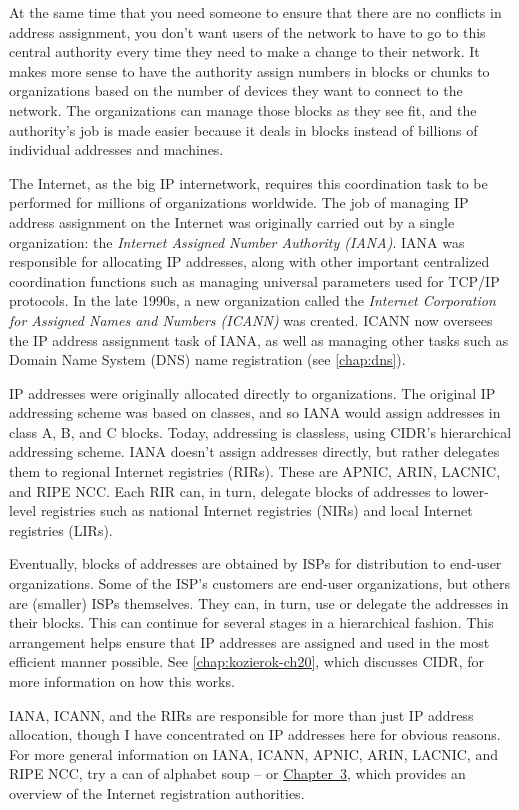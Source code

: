 At the same time that you need someone to ensure that there are no
conflicts in address assignment, you don't want users of the network to
have to go to this central authority every time they need to make a
change to their network. It makes more sense to have the authority
assign numbers in blocks or chunks to organizations based on the number
of devices they want to connect to the network. The organizations can
manage those blocks as they see fit, and the authority's job is made
easier because it deals in blocks instead of billions of individual
addresses and machines.

The Internet, as the big IP internetwork, requires this coordination
task to be performed for millions of organizations worldwide. The job of
managing IP address assignment on the Internet was originally carried
out by a single organization: the {\emph{Internet Assigned Number
Authority (IANA)}}. IANA was responsible for allocating IP addresses,
along with other important centralized coordination functions such as
managing universal parameters used for TCP/IP protocols. In the late
1990s, a new organization called the {\emph{Internet Corporation for
Assigned Names and Numbers (ICANN)}} was created.
ICANN now oversees the IP address assignment task of IANA, as well as managing other tasks such as Domain Name System (DNS) name registration (see \vref{chap:dns}).

IP addresses were originally allocated directly to organizations.
The original IP addressing scheme was based on classes, and so IANA would assign addresses in class A, B, and C blocks.
Today, addressing is classless, using CIDR's hierarchical addressing scheme.
IANA doesn't assign addresses directly, but rather delegates them to regional Internet registries (RIRs).
These are APNIC, ARIN, LACNIC, and RIPE NCC.
Each RIR can, in turn, delegate blocks of addresses to lower-level registries such as national Internet registries (NIRs) and local Internet registries (LIRs).

Eventually, blocks of addresses are obtained by ISPs for distribution to
end-user organizations. Some of the ISP's customers are end-user
organizations, but others are (smaller) ISPs themselves. They can, in
turn, use or delegate the addresses in their blocks. This can continue
for several stages in a hierarchical fashion. This arrangement helps
ensure that IP addresses are assigned and used in the most efficient
manner possible. See \vref{chap:kozierok-ch20}, which discusses CIDR, for more information on how this works.

IANA, ICANN, and the RIRs are responsible for more than just IP address allocation, though I have concentrated on IP addresses here for obvious reasons.
For more general information on IANA, ICANN, APNIC, ARIN, LACNIC, and RIPE NCC, try a can of alphabet soup
-- or \protect\hyperlink{ch03.html}{Chapter~3}, which provides an overview of the Internet registration authorities.

